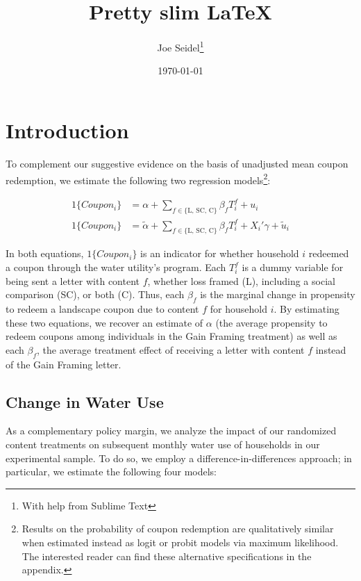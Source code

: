 \documentclass[12pt]{article}%
\begin{document}
\title{\textbf{Pretty slim \LaTeX}}
\author{Joe Seidel\thanks{With help from Sublime Text}}
\date{\today}

\maketitle

\newpage

\section{Introduction}

To complement our suggestive evidence on the basis of unadjusted mean coupon redemption, we estimate the following two regression models\footnote{Results on the probability of coupon redemption are qualitatively similar when estimated instead as logit or probit models via maximum likelihood. The interested reader can find these alternative specifications in the appendix.}:

\begin{align}
1\{Coupon_{i}\} &= \alpha + \displaystyle\sum_{f \in \{\text{L, SC, C}\}} \beta_f T^f_i + u_i \label{eq:uptake_nocovars}  \\
1\{Coupon_{i}\} &= \tilde{\alpha} + \displaystyle\sum_{f \in \{\text{L, SC, C}\}} \beta_f T^f_i + X_i'\gamma + \tilde{u}_i \label{eq:uptake_covars}
\end{align}

In both equations, $1\{Coupon_{i}\}$ is an indicator for whether household $i$ redeemed a coupon through the water utility's program. Each $T_i^f$ is a dummy variable for being sent a letter with content $f$, whether loss framed (L), including a social comparison (SC), or both (C). Thus, each $\beta_f$ is the marginal change in propensity to redeem a landscape coupon due to content $f$ for household $i$. By estimating these two equations, we recover an estimate of $\alpha$ (the average propensity to redeem coupons among individuals in the Gain Framing treatment) as well as each $\beta_f$, the average treatment effect of receiving a letter with content $f$ instead of the Gain Framing letter.

\subsection{Change in Water Use}

As a complementary policy margin, we analyze the impact of our randomized content treatments on subsequent monthly water use of households in our experimental sample. To do so, we employ a difference-in-differences approach; in particular, we estimate the following four models:
\end{document}

